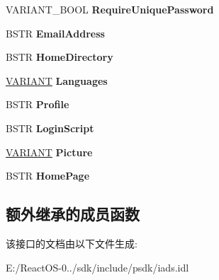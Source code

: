 \begin{DoxyCompactItemize}
\item 
\mbox{\label{interface_i_a_ds_user_a440c666115908df00072991fab071cc7}} 
V\+A\+R\+I\+A\+N\+T\+\_\+\+B\+O\+OL {\bfseries Require\+Unique\+Password}
\item 
\mbox{\label{interface_i_a_ds_user_aa9fd364c7cb0101a6c89ed8fe49e6f61}} 
B\+S\+TR {\bfseries Email\+Address}
\item 
\mbox{\label{interface_i_a_ds_user_ae4488e7f1e07d567b03d09bb60fa2e2b}} 
B\+S\+TR {\bfseries Home\+Directory}
\item 
\mbox{\label{interface_i_a_ds_user_a83b8006575ddac7c007f8d3c99c2ef9b}} 
\hyperlink{structtag_v_a_r_i_a_n_t}{V\+A\+R\+I\+A\+NT} {\bfseries Languages}
\item 
\mbox{\label{interface_i_a_ds_user_a0b69459b38aad8cbea6ead8aadfd4811}} 
B\+S\+TR {\bfseries Profile}
\item 
\mbox{\label{interface_i_a_ds_user_a3c0f1a9f02c540f79162c8ff491a5b08}} 
B\+S\+TR {\bfseries Login\+Script}
\item 
\mbox{\label{interface_i_a_ds_user_ac5e3693f1ee9252199e92e375e252925}} 
\hyperlink{structtag_v_a_r_i_a_n_t}{V\+A\+R\+I\+A\+NT} {\bfseries Picture}
\item 
\mbox{\label{interface_i_a_ds_user_a8bc852307e8dfc9125ffcd7d8c5bdb01}} 
B\+S\+TR {\bfseries Home\+Page}
\end{DoxyCompactItemize}
\subsection*{额外继承的成员函数}


该接口的文档由以下文件生成\+:\begin{DoxyCompactItemize}
\item 
E\+:/\+React\+O\+S-\/0../sdk/include/psdk/iads.\+idl\end{DoxyCompactItemize}
